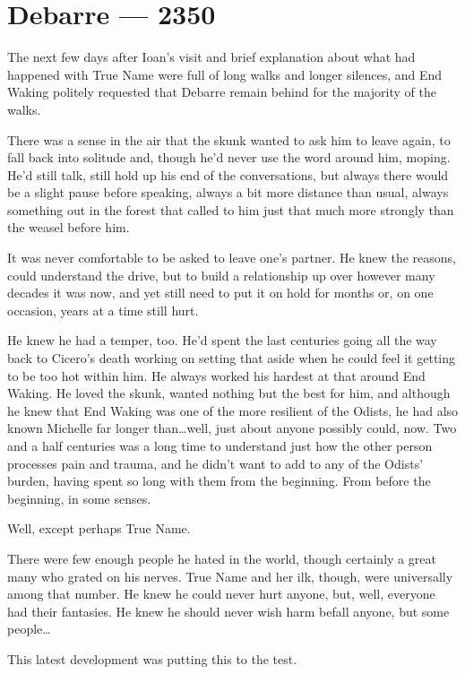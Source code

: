 \hypertarget{debarre-2350}{%
\chapter{Debarre — 2350}\label{debarre-2350}}

The next few days after Ioan's visit and brief explanation about what had happened with True Name were full of long walks and longer silences, and End Waking politely requested that Debarre remain behind for the majority of the walks.

There was a sense in the air that the skunk wanted to ask him to leave again, to fall back into solitude and, though he'd never use the word around him, moping. He'd still talk, still hold up his end of the conversations, but always there would be a slight pause before speaking, always a bit more distance than usual, always something out in the forest that called to him just that much more strongly than the weasel before him.

It was never comfortable to be asked to leave one's partner. He knew the reasons, could understand the drive, but to build a relationship up over however many decades it was now, and yet still need to put it on hold for months or, on one occasion, years at a time still hurt.

He knew he had a temper, too. He'd spent the last centuries going all the way back to Cicero's death working on setting that aside when he could feel it getting to be too hot within him. He always worked his hardest at that around End Waking. He loved the skunk, wanted nothing but the best for him, and although he knew that End Waking was one of the more resilient of the Odists, he had also known Michelle far longer than\ldots well, just about anyone possibly could, now. Two and a half centuries was a long time to understand just how the other person processes pain and trauma, and he didn't want to add to any of the Odists' burden, having spent so long with them from the beginning. From before the beginning, in some senses.

Well, except perhaps True Name.

There were few enough people he hated in the world, though certainly a great many who grated on his nerves. True Name and her ilk, though, were universally among that number. He knew he could never hurt anyone, but, well, everyone had their fantasies. He knew he should never wish harm befall anyone, but some people\ldots{}

This latest development was putting this to the test.

